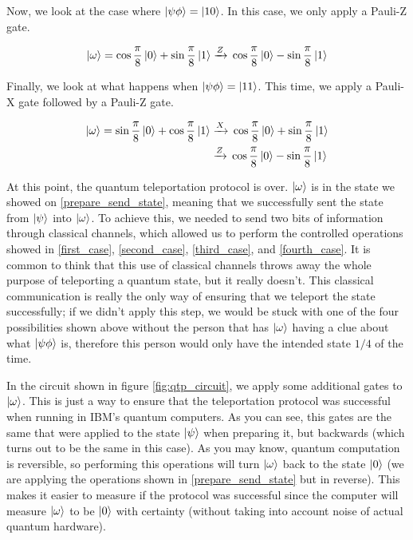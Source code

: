 \documentclass[]{article}
\newcommand\Xto{\xrightarrow{X}}
\newcommand\Zto{\xrightarrow{Z}}
\begin{document}
Now, we look at the case where $\ket{\psi\phi}=\ket{10}$. In this case, we only apply a Pauli-Z gate. 

\begin{align} \label{third_case}
    \ket{\omega}=\cos{\frac{\pi}{8}}\ket{0} + \sin{\frac{\pi}{8}}\ket{1} \Zto{} \cos{\frac{\pi}{8}}\ket{0} - \sin{\frac{\pi}{8}}\ket{1}
\end{align}

Finally, we look at what happens when $\ket{\psi\phi}=\ket{11}$. This time, we apply a Pauli-X gate followed by a Pauli-Z gate.

\begin{align} 
    \ket{\omega}=\sin{\frac{\pi}{8}}\ket{0} + \cos{\frac{\pi}{8}}\ket{1} &\Xto{} \cos{\frac{\pi}{8}}\ket{0} + \sin{\frac{\pi}{8}}\ket{1} \\
    &\Zto{} \cos{\frac{\pi}{8}}\ket{0} - \sin{\frac{\pi}{8}}\ket{1} \label{fourth_case}
\end{align}

At this point, the quantum teleportation protocol is over. $\ket{\omega}$ is in the state we showed on \eqref{prepare_send_state}, meaning that we successfully sent the state from $\ket{\psi}$ into $\ket{\omega}$. To achieve this, we needed to send two bits of information through classical channels, which allowed us to perform the controlled operations showed in \eqref{first_case}, \eqref{second_case}, \eqref{third_case}, and \eqref{fourth_case}. It is common to think that this use of classical channels throws away the whole purpose of teleporting a quantum state, but it really doesn't. This classical communication is really the only way of ensuring that we teleport the state successfully; if we didn't apply this step, we would be stuck with one of the four possibilities shown above without the person that has $\ket{\omega}$ having a clue about what $\ket{\psi\phi}$ is, therefore this person would only have the intended state $1/4$ of the time.

In the circuit shown in figure \ref{fig:qtp_circuit}, we apply some additional gates to $\ket{\omega}$. This is just a way to ensure that the teleportation protocol was successful when running in IBM's quantum computers. As you can see, this gates are the same that were applied to the state $\ket{\psi}$ when preparing it, but backwards (which turns out to be the same in this case). As you may know, quantum computation is reversible, so performing this operations will turn $\ket{\omega}$ back to the state $\ket{0}$ (we are applying the operations shown in \eqref{prepare_send_state} but in reverse). This makes it easier to measure if the protocol was successful since the computer will measure $\ket{\omega}$ to be $\ket{0}$ with certainty (without taking into account noise of actual quantum hardware). 
\end{document}
